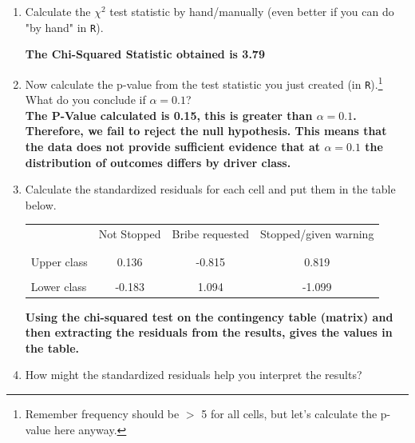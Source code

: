 \documentclass[12pt,letterpaper]{article}
\begin{document}
\begin{enumerate}
	
	\item [(a)]
	Calculate the $\chi^2$ test statistic by hand/manually (even better if you can do "by hand" in \texttt{R}).\\
	\vspace{0.1cm}
	  
	
	\textbf{The Chi-Squared Statistic obtained is 3.79}
	
	\item [(b)]
	Now calculate the p-value from the test statistic you just created (in \texttt{R}).\footnote{Remember frequency should be $>$ 5 for all cells, but let's calculate the p-value here anyway.}  What do you conclude if $\alpha = 0.1$?\\
		 
		\textbf{The P-Value calculated is 0.15, this is greater than $\alpha = 0.1$. Therefore, we fail to reject the null hypothesis. This means that the data does not provide sufficient evidence that at $\alpha = 0.1$ the distribution of outcomes differs by driver class.} 
		
	\newpage
	\item [(c)] Calculate the standardized residuals for each cell and put them in the table below.
	\vspace{1cm}
	
	\begin{table}[h]
		\centering
		\begin{tabular}{l | c c c }
			& Not Stopped & Bribe requested & Stopped/given warning \\
			\\[-1.8ex] 
			\hline \\[-1.8ex]
			Upper class  &0.136  &-0.815  &0.819  \\
			\\
			Lower class &-0.183  &1.094  &-1.099  \\
			
		\end{tabular}
	\end{table}
		  
		
		\textbf{Using the chi-squared test on the contingency table (matrix) and then extracting the residuals from the results, gives the values in the table.}
	
	
	\vspace{0.5cm}
	\item [(d)] How might the standardized residuals help you interpret the results?  
	

\end{enumerate}
\end{document}
